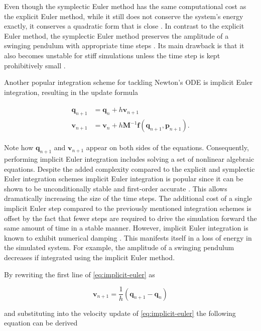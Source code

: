 \noindent Even though the symplectic Euler method has the same computational cost as the explicit Euler method, while it still does not conserve
the system's energy exactly, it conserves a quadratic form that is close \cite{servin2006}. In contrast to the explicit Euler method, the 
symplectic Euler method preserves the amplitude of a swinging pendulum with appropriate time steps \cite{stern2006}. Its main drawback 
is that it also becomes unstable for stiff simulations unless the time step is kept prohibitively small \cite{servin2006}. 

Another popular integration scheme for tackling Newton's ODE is implicit Euler integration, resulting in the update formula

\begin{align}
    \begin{split}\label{eq:implicit-euler}
        \bm{q}_{n+1} &= \bm{q}_n + h\bm{v}_{n+1}\\
        \bm{v}_{n+1} &= \bm{v}_n + h\bm{M}^{-1}\bm{f}(\bm{q}_{n+1}, \bm{p}_{n+1}).
    \end{split}
\end{align}

\noindent Note how $\bm{q}_{n+1}$ and $\bm{v}_{n+1}$ appear on both sides of the equations. Consequently, performing implicit 
Euler integration includes solving a set of nonlinear algebraic equations. Despite the added complexity compared to the explicit and
symplectic Euler integration schemes implicit Euler integration is popular since it can be shown to be unconditionally stable and first-order
accurate \cite{chapra2005}. This allows dramatically increasing the size of the time steps. The additional cost of a single implicit Euler 
step compared to the previously mentioned integration schemes is offset by the fact that fewer steps are required to drive the 
simulation forward the same amount of time in a stable manner. However, implicit Euler integration is known to exhibit numerical 
damping \cite{stern2006}. This manifests itself in a loss of energy in the simulated system. For example, the amplitude of a swinging 
pendulum decreases if integrated using the implicit Euler method.

By rewriting the first line of \cref{eq:implicit-euler} as

\[
    \bm{v}_{n+1} = \frac{1}{h}(\bm{q}_{n+1} - \bm{q}_n)
\]

\noindent and substituting into the velocity update of \cref{eq:implicit-euler} the following equation can be derived

